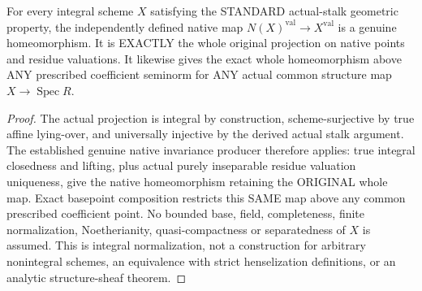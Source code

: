 \begin{theorem}
\label{scheme:actual-integral-geometric-unibranch-normalization-native}
For every integral scheme $X$ satisfying the STANDARD actual-stalk
geometric property, the independently defined native map
$N(X)^{\mathrm{val}}\to X^{\mathrm{val}}$ is a genuine homeomorphism.
It is EXACTLY the whole original projection on native points and
residue valuations. It likewise gives the exact whole homeomorphism
above ANY prescribed coefficient seminorm for ANY actual common
structure map $X\to\operatorname{Spec}R$.
\leanok
\end{theorem}
\begin{proof}
The actual projection is integral by construction, scheme-surjective
by true affine lying-over, and universally injective by the derived
actual stalk argument. The established genuine native invariance
producer therefore applies: true integral closedness and lifting,
plus actual purely inseparable residue valuation uniqueness, give
the native homeomorphism retaining the ORIGINAL whole map. Exact
basepoint composition restricts this SAME map above any common
prescribed coefficient point. No bounded base, field, completeness,
finite normalization, Noetherianity, quasi-compactness or separatedness
of $X$ is assumed. This is integral normalization, not a construction
for arbitrary nonintegral schemes, an equivalence with strict
henselization definitions, or an analytic structure-sheaf theorem.
\end{proof}
